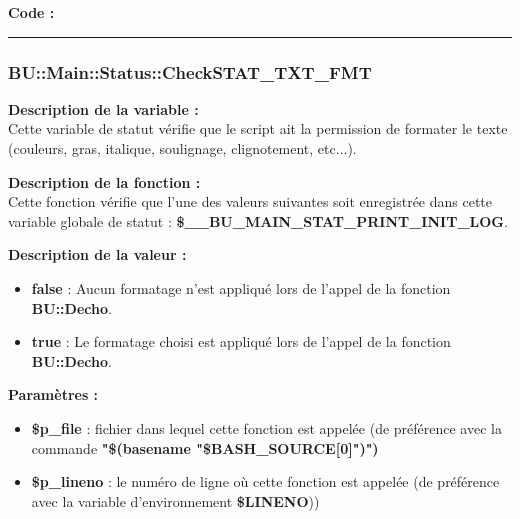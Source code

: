 \documentclass[a4paper,10pt]{article}
\begin{document}
\begin{justify}
    \textbf{Code :}
\end{justify}



\color{blue}\par\noindent\rule{\textwidth}{0.4pt}\color{white}

\color{blue}
\subsubsection{\color{mauve}BU::Main::Status::CheckSTAT\_TXT\_FMT}\color{white}

\begin{justify}
    \textbf{Description de la variable :}\\
    Cette variable de statut vérifie que le script ait la permission de formater le texte (couleurs, gras, italique, soulignage, clignotement, etc...).
\end{justify}

\begin{justify}
    \textbf{Description de la fonction :}\\
    Cette fonction vérifie que l'une des valeurs suivantes soit enregistrée dans cette variable globale de statut : \textbf{\color{orange}\$\_\_BU\_MAIN\_STAT\_PRINT\_INIT\_LOG}.
\end{justify}

\begin{justify}
    \textbf{Description de la valeur :}

    \begin{itemize}
        \item \textbf{false} : Aucun formatage n'est appliqué lors de l'appel de la fonction \textbf{\color{mauve}BU::Decho}.\\

        \item \textbf{true} : Le formatage choisi est appliqué lors de l'appel de la fonction \textbf{\color{mauve}BU::Decho}.
    \end{itemize}

\end{justify}

\begin{justify}
    \textbf{Paramètres :}

    \begin{itemize}
        \item \color{orange}\textbf{\$p\_file}\color{white} : fichier dans lequel cette fonction est appelée (de préférence avec la commande \textbf{"\$(\color{gray}basename \color{white}"\color{orange}\$BASH\_SOURCE[0]\color{white}")")}\\

        \item \color{orange}\textbf{\$p\_lineno}\color{white} : le numéro de ligne où cette fonction est appelée (de préférence avec la variable d'environnement \textbf{\color{orange}\$LINENO}))
    \end{itemize}
\end{justify}
\end{document}
